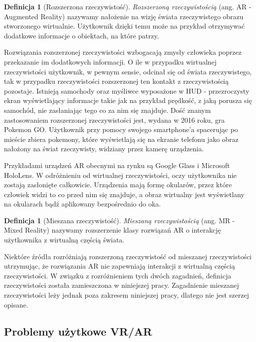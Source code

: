 \documentclass[a4paper,11pt,twoside]{report}
\theoremstyle{definition}
\newtheorem{definition}[theorem]{Definicja}
\begin{document}
\begin{definition}[Rozszerzona rzeczywistość]
\textit{Rozszerzoną rzeczywistością} (ang. AR - Augmented Reality) nazywamy nałożenie na wizję świata rzeczywistego obrazu stworzonego wirtualnie. Użytkownik dzięki temu może na przykład otrzymywać dodatkowe informacje o obiektach, na które patrzy.
\end{definition}

Rozwiązania rozszerzonej rzeczywistości wzbogacają zmysły człowieka poprzez przekazanie im dodatkowych informacji. O ile w przypadku wirtualnej rzeczywistości użytkownik, w pewnym sensie, odcinał się od świata rzeczywistego, tak w przypadku rzeczywistości rozszerzonej ten kontakt z rzeczywistością pozostaje. Istnieją samochody oraz myśliwce wyposażone w HUD - przezroczysty ekran wyświetlający informacje takie jak na przykład prędkość, z jaką porusza się samochód, nie zasłaniając tego co za nim się znajduje. Dość znanym zastosowaniem rozszerzonej rzeczywistości jest, wydana w 2016 roku, gra Pokemon GO. Użytkownik przy pomocy swojego smartphone'a spacerując po mieście zbiera pokemony, które wyświetlają się na ekranie telefonu jako obraz nałożony na  świat rzeczywisty, widziany przez kamerę urządzenia.

Przykładami urządzeń AR obecnymi na rynku są Google Glass i Microsoft HoloLens. W odróżnieniu od wirtualnej rzeczywistości, oczy użytkownika nie zostają zasłonięte całkowicie. Urządzenia mają formę okularów, przez które człowiek widzi to co przed nim się znajduje, a obraz wirtualny jest wyświetlany na okularach bądź aplikowany bezpośrednio do oka.

\begin{definition}[Mieszana rzeczywistość]
\textit{Mieszaną rzeczywistością} (ang. MR - Mixed Reality) nazywamy rozszerzenie klasy rozwiązań AR o interakcję użytkownika z wirtualną częścią świata.
\end{definition}

Niektóre źródła\cite{ARMRdifferences} rozróżniają rozszerzoną rzeczywistość od mieszanej rzeczywistości utrzymując, że rozwiązania AR nie zapewniają interakcji z wirtualną częścią rzeczywistości. W związku z rozróżnieniem tych dwóch zagadnień, definicja rzeczywistości została zamieszczona w niniejszej pracy. Zagadnienie mieszanej rzeczywistości leży jednak poza zakresem niniejszej pracy, dlatego nie jest szerzej opisane. 

\subsection{Problemy użytkowe VR/AR }
\end{document}
